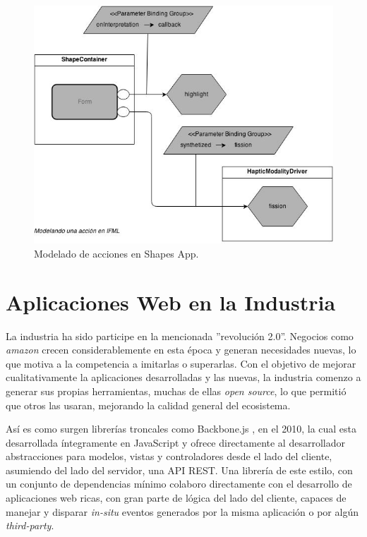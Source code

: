 \begin{center}
  \begin{figure}[h]
    \includegraphics[scale=1,width=\textwidth]{gfx/ifml_example}
    \caption{Modelado de acciones en Shapes App.}
    \label{fig:extension_ifml_example}
  \end{figure}
\end{center}

\section{Aplicaciones Web en la Industria} \label{sec:extension_industria_intro}

La industria ha sido participe en la mencionada ''revolución 2.0''. Negocios como \emph{amazon} crecen considerablemente en esta época y generan necesidades nuevas, lo que motiva a la competencia a imitarlas o superarlas. Con el objetivo de mejorar cualitativamente la aplicaciones desarrolladas y las nuevas, la industria comenzo a generar sus propias herramientas, muchas de ellas \emph{open source}, lo que permitió que otros las usaran, mejorando la calidad general del ecosistema.

Así es como surgen librerías troncales como Backbone.js \citep{ind:backbone}, en el 2010, la cual esta desarrollada íntegramente en JavaScript y ofrece directamente al desarrollador abstracciones para modelos, vistas y controladores desde el lado del cliente, asumiendo del lado del servidor, una API REST. Una librería de este estilo, con un conjunto de dependencias mínimo colaboro directamente con el desarrollo de aplicaciones web ricas, con gran parte de lógica del lado del cliente, capaces de manejar y disparar \emph{in-situ} eventos generados por la misma aplicación o por algún \emph{third-party}. 

